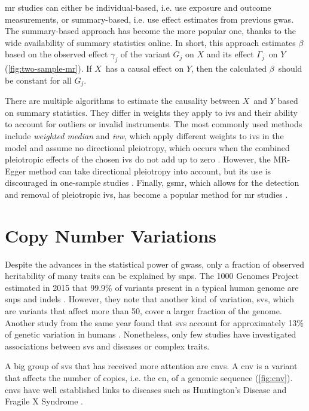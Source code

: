 \documentclass[draft]{scrbook}
\begin{document}
\Gls{mr} studies can either be individual-based, i.e. use exposure and outcome measurements, or summary-based, i.e. use effect estimates from previous \gls{gwas}.
The summary-based approach has become the more popular one, thanks to the wide availability of summary statistics online.
In short, this approach estimates $\beta$ based on the observed effect $\gamma_j$ of the variant $G_j$ on $X$ and its effect $\Gamma_j$ on $Y$ (\cref{fig:two-sample-mr}).
If $X$ has a causal effect on $Y$, then the calculated $\beta$ should be constant for all $G_j$.

There are multiple algorithms to estimate the causality between $X$ and $Y$ based on summary statistics.
They differ in weights they apply to \glspl{iv} and their ability to account for outliers or invalid instruments.
The most commonly used methods include \textit{weighted median} and \textit{\gls{ivw}}, which apply different weights to \glspl{iv} in the model and assume no directional pleiotropy, which occurs when the combined pleiotropic effects of the chosen \glspl{iv} do not add up to zero \cite{Burgess2013,Bowden2016}.
However, the MR-Egger method can take directional pleiotropy into account, but its use is discouraged in one-sample studies \cite{Bowden2015,Bowden2017}.
Finally, \gls{gsmr}, which allows for the detection and removal of pleiotropic \glspl{iv}, has become a popular method for \gls{mr} studies \cite{Zhu2018}.

\section{Copy Number Variations}
Despite the advances in the statistical power of \glspl{gwas}, only a fraction of observed heritability of many traits can be explained by \glspl{snp}.
The 1000 Genomes Project estimated in 2015 that 99.9\% of variants present in a typical human genome are \glspl{snp} and \glspl{indel} \cite{Auton2015a}.
However, they note that another kind of variation, \glspl{sv}, which are variants that affect more than \qty{50}{\base}, cover a larger fraction of the genome.
Another study from the same year found that \glspl{sv} account for approximately 13\% of genetic variation in humans \cite{Sudmant2015}.
Nonetheless, only few studies have investigated associations between \glspl{sv} and diseases or complex traits.



A big group of \glspl{sv} that has received more attention are \glspl{cnv}.
A \gls{cnv} is a variant that affects the number of copies, i.e. the \gls{cn}, of a genomic sequence (\cref*{fig:cnv}).
\Glspl{cnv} have well established links to diseases such as Huntington's Disease and Fragile X Syndrome \cite{MacDonald1993,Verkerk1991}.
\end{document}

